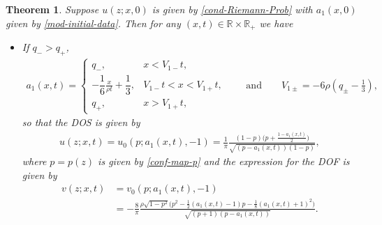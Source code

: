 \documentclass[pdftex]{sigma}
\numberwithin{equation}{section}
\newtheorem{Theorem}{Theorem}[section]
\def\R{{\mathbb R}}
\begin{document}
\begin{Theorem}\label{Mod-DOS}
Suppose $u(z;x,0)$
is given by \eqref{cond-Riemann-Prob}
with $a_1(x,0)$ given by \eqref{mod-initial-data}. Then for any $(x,t)\in \R\times \R_+$
we have
\begin{itemize}\itemsep=0pt
\item[$(i)$] If $q_->q_+$,
\begin{align*}
a_1(x,t)=\begin{cases}
q_-,& x<V_{1-}t,\\
-\dfrac{1}{6}\frac{x}{\rho t}+\dfrac{1}{3},& V_{1-}t<x<V_{1+}t,\\
q_+,& x>V_{1+}t,
\end{cases}\qquad \text{and} \qquad V_{1\pm}=-6\rho\left(q_\pm-\frac{1}{3}\right),
\end{align*}
so that the DOS is given by
\begin{align}
u(z;x,t)=u_0(p;a_1(x,t),-1)=\frac{1}{\pi}\frac{(1-p)\bigl(p+\frac{1-a_1(x,t)}{2}\bigr)}{\sqrt{(p-a_1(x,t))(1-p)}},\label{eq: mod-dos}
\end{align}
where $p=p(z)$ is given by \eqref{conf-map-p} and the expression for the DOF is given by
\begin{align}
v(z;x,t)&{}=v_0(p;a_1(x,t),-1)\nonumber\\
&{}=-\frac{8}{\pi}\frac{\rho\sqrt{1-p^2}\bigl(p^2-\frac{1}{2}(a_1(x,t)-1)p-\frac{1}{8}(a_1(x,t)+1)^2\bigr)}{\sqrt{(p+1)(p-a_1(x,t))}}.\label{eq: mod-dof}
\end{align}


\end{itemize}
\end{Theorem}
\end{document}
